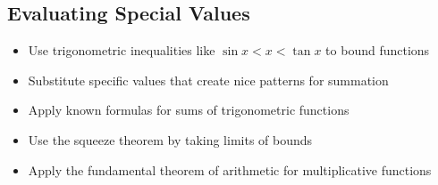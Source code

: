 \subsection*{Evaluating Special Values}
\begin{itemize}
\item Use trigonometric inequalities like $\sin x < x < \tan x$ to bound functions
\item Substitute specific values that create nice patterns for summation
\item Apply known formulas for sums of trigonometric functions
\item Use the squeeze theorem by taking limits of bounds
\item Apply the fundamental theorem of arithmetic for multiplicative functions
\end{itemize}